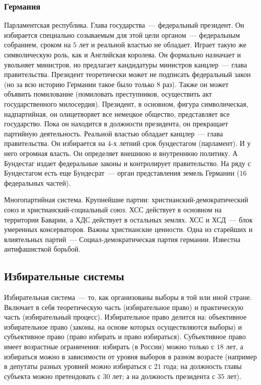 \documentclass[12pt]{article}
\begin{document}
	\subsubsection{Германия}
	\begin{note}
		Парламентская республика. Глава государства~--- федеральный президент. Он избирается специально созываемым для этой цели органом~--- федеральным собранием, сроком на $5$ лет и реальной властью не обладает. Играет такую же символическую роль, как и Английская королева. Он формально назначает и увольняет министров, но предлагает кандидатуры министров канцлер~--- глава правительства. Президент теоретически может не подписать федеральный закон (но за всю историю Германии такое было только $8$ раз). Также он может объявить помилование (помиловать преступников, осуществить акт государственного милосердия). Президент, в основном, фигура символическая, надпартийная, он олицетворяет все немецкое общество, представляет все государство. Пока он находится в должности президента, он прекращает партийную деятельность. Реальной властью обладает канцлер~--- глава правительства. Он избирается на $4$-х летний срок бундестагом (парламент). И у него огромная власть. Он определяет внешнюю и внутреннюю политику. А Бундестаг издает федеральные законы и контролирует правительство. На ряду с Бундестагом есть еще Бундесрат~--- орган представления земель Германии ($16$ федеральных частей).
	\end{note}
	\begin{note}
		Многопартийная система. Крупнейшие партии: христианский-демократический союз и христианский-социальный союз. ХСС действует в основном на территории Баварии, а ХДС действует в остальных землях. ХСС и ХСД~--- блок умеренных консерваторов. Важны христианские ценности. Одна из старейших и влиятельных партий~--- Социал-демократическая партия германии. Известна антифашисткой борьбой.
	\end{note}
	\subsection{Избирательные системы}
	\begin{definition}
		Избирательная система~--- то, как организованы выборы в той или иной стране. Включает в себя теоретическую часть (избирательное право) и практическую часть (избирательный процесс). Избирательное право делится на: объективное избирательное право (законы, на основе которых осуществляются выборы) и субъективное право (право избирать и право избираться). Субъективное право имеет возрастные ограничения: избирать (в России) можно только с $18$ лет, а избираться можно в зависимости от уровня выборов в разном возрасте (например в депутаты разных уровней можно избираться с $21$ года; на должность главы субъекта можно претендовать с $30$ лет; а на должность президента с $35$ лет).
	\end{definition}
\end{document}
